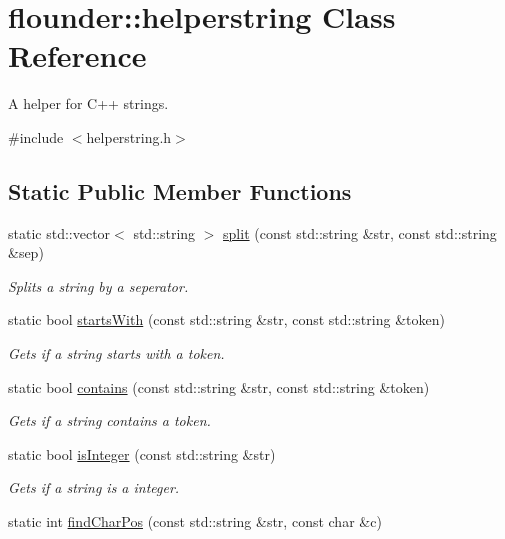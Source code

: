 \hypertarget{classflounder_1_1helperstring}{}\section{flounder\+:\+:helperstring Class Reference}
\label{classflounder_1_1helperstring}


A helper for C++ strings.  




{\ttfamily \#include $<$helperstring.\+h$>$}

\subsection*{Static Public Member Functions}
\begin{DoxyCompactItemize}
\item 
static std\+::vector$<$ std\+::string $>$ \hyperlink{classflounder_1_1helperstring_a06fd29db727eba0d787e309528f323e7}{split} (const std\+::string \&str, const std\+::string \&sep)
\begin{DoxyCompactList}\small\item\em Splits a string by a seperator. \end{DoxyCompactList}\item 
static bool \hyperlink{classflounder_1_1helperstring_a842ad27a3dae27fc333ec696775db292}{starts\+With} (const std\+::string \&str, const std\+::string \&token)
\begin{DoxyCompactList}\small\item\em Gets if a string starts with a token. \end{DoxyCompactList}\item 
static bool \hyperlink{classflounder_1_1helperstring_a549c7b0afdfe5ad3825d2f813b2045f3}{contains} (const std\+::string \&str, const std\+::string \&token)
\begin{DoxyCompactList}\small\item\em Gets if a string contains a token. \end{DoxyCompactList}\item 
static bool \hyperlink{classflounder_1_1helperstring_a91c95a1f719a7cf6211971b6d93b39ce}{is\+Integer} (const std\+::string \&str)
\begin{DoxyCompactList}\small\item\em Gets if a string is a integer. \end{DoxyCompactList}\item 
static int \hyperlink{classflounder_1_1helperstring_a17e68d4de676fc161a693ebc874191d1}{find\+Char\+Pos} (const std\+::string \&str, const char \&c)

\end{DoxyCompactItemize}

